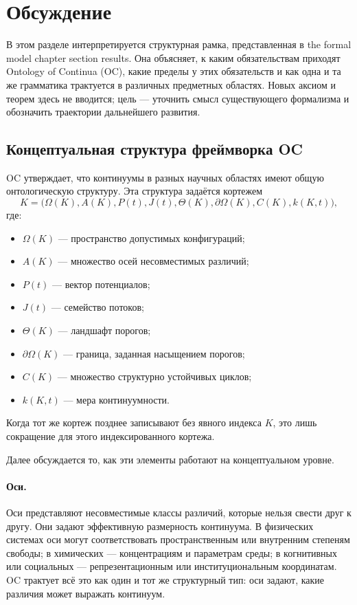 
\section{Обсуждение}
\label{sec:discussion}

В этом разделе интерпретируется структурная рамка, представленная в
the formal model chapter section results. Она объясняет, к каким обязательствам
приходят Ontology of Continua (OC), какие пределы у этих обязательств и как одна и
та же грамматика трактуется в различных предметных областях.
Новых аксиом и теорем здесь не вводится; цель — уточнить смысл существующего
формализма и обозначить траектории дальнейшего развития.

\subsection{Концептуальная структура фреймворка OC}

OC утверждает, что континуумы в разных научных областях имеют общую онтологическую
структуру. Эта структура задаётся кортежем
\[
  K = \big(\Omega(K), A(K), P(t), J(t), \Theta(K), \partial\Omega(K), C(K), k(K,t)\big),
\]
где:
\begin{itemize}
    \item \(\Omega(K)\) — пространство допустимых конфигураций;
    \item \(A(K)\) — множество осей несовместимых различий;
    \item \(P(t)\) — вектор потенциалов;
    \item \(J(t)\) — семейство потоков;
    \item \(\Theta(K)\) — ландшафт порогов;
    \item \(\partial\Omega(K)\) — граница, заданная насыщением порогов;
    \item \(C(K)\) — множество структурно устойчивых циклов;
    \item \(k(K,t)\) — мера континуумности.
\end{itemize}
Когда тот же кортеж позднее записывают без явного индекса \(K\), это лишь
сокращение для этого индексированного кортежа.

Далее обсуждается то, как эти элементы работают на концептуальном уровне.

\paragraph{Оси.}
Оси представляют несовместимые классы различий, которые нельзя свести друг к другу.
Они задают эффективную размерность континуума.
В физических системах оси могут соответствовать пространственным или внутренним
степеням свободы; в химических — концентрациям и параметрам среды; в
когнитивных или социальных — репрезентационным или институциональным
координатам.
OC трактует всё это как один и тот же структурный тип: оси задают, какие различия
может выражать континуум.

